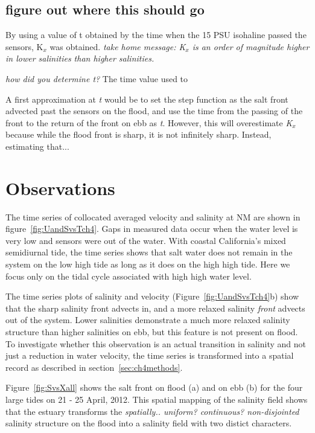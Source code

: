 \subsection{figure out where this should go}

By using a value of t obtained by the time when the 15 PSU isohaline passed the sensors, K$_x$ was obtained.  \emph{take home message: K$_x$ is an order of magnitude higher in lower salinities than higher salinities. }


\emph{how did you determine t?}
The time value used to 

A first approximation at \emph{t} would be to set the step function as the salt front advected past the sensors on the flood, and use the time from the passing of the front to the return of the front on ebb as \emph{t}. However, this will overestimate \emph{K$_x$} because while the flood front is sharp, it is not infinitely sharp.  Instead, estimating that...  



\section{Observations} \label{sec:ObsCh4}
The time series of collocated averaged velocity and salinity at NM are shown in figure~\ref{fig:UandSvsTch4}. Gaps in measured data occur when the water level is very low and sensors were out of the water. With coastal California's mixed semidiurnal tide, the time series shows that salt water does not remain in the system on the low high tide as long as it does on the high high tide. Here we focus only on the tidal cycle associated with high high water level. 

The time series plots of salinity and velocity (Figure~\ref{fig:UandSvsTch4}b) show that the sharp salinity front advects in, and a more relaxed salinity \emph{front} advects out of the system. Lower salinities demonstrate a much more relaxed salinity structure than higher salinities on ebb, but this feature is not present on flood. To investigate whether this observation is an actual transition in salinity and not just a reduction in water velocity, the time series is transformed into a spatial record as described in section~\ref{sec:ch4methods}. 

Figure~\ref{fig:SvsXall} shows the salt front on flood (a) and on ebb (b) for the four large tides on 21 - 25 April, 2012. This spatial mapping of the salinity field shows that the estuary transforms the \emph{spatially.. uniform? continuous? non-disjointed} salinity structure on the flood into a salinity field with two distict characters.

